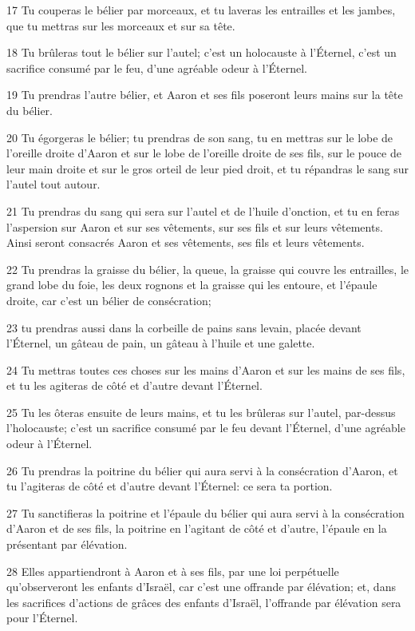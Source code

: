 \par 17 Tu couperas le bélier par morceaux, et tu laveras les entrailles et les jambes, que tu mettras sur les morceaux et sur sa tête.
\par 18 Tu brûleras tout le bélier sur l'autel; c'est un holocauste à l'Éternel, c'est un sacrifice consumé par le feu, d'une agréable odeur à l'Éternel.
\par 19 Tu prendras l'autre bélier, et Aaron et ses fils poseront leurs mains sur la tête du bélier.
\par 20 Tu égorgeras le bélier; tu prendras de son sang, tu en mettras sur le lobe de l'oreille droite d'Aaron et sur le lobe de l'oreille droite de ses fils, sur le pouce de leur main droite et sur le gros orteil de leur pied droit, et tu répandras le sang sur l'autel tout autour.
\par 21 Tu prendras du sang qui sera sur l'autel et de l'huile d'onction, et tu en feras l'aspersion sur Aaron et sur ses vêtements, sur ses fils et sur leurs vêtements. Ainsi seront consacrés Aaron et ses vêtements, ses fils et leurs vêtements.
\par 22 Tu prendras la graisse du bélier, la queue, la graisse qui couvre les entrailles, le grand lobe du foie, les deux rognons et la graisse qui les entoure, et l'épaule droite, car c'est un bélier de consécration;
\par 23 tu prendras aussi dans la corbeille de pains sans levain, placée devant l'Éternel, un gâteau de pain, un gâteau à l'huile et une galette.
\par 24 Tu mettras toutes ces choses sur les mains d'Aaron et sur les mains de ses fils, et tu les agiteras de côté et d'autre devant l'Éternel.
\par 25 Tu les ôteras ensuite de leurs mains, et tu les brûleras sur l'autel, par-dessus l'holocauste; c'est un sacrifice consumé par le feu devant l'Éternel, d'une agréable odeur à l'Éternel.
\par 26 Tu prendras la poitrine du bélier qui aura servi à la consécration d'Aaron, et tu l'agiteras de côté et d'autre devant l'Éternel: ce sera ta portion.
\par 27 Tu sanctifieras la poitrine et l'épaule du bélier qui aura servi à la consécration d'Aaron et de ses fils, la poitrine en l'agitant de côté et d'autre, l'épaule en la présentant par élévation.
\par 28 Elles appartiendront à Aaron et à ses fils, par une loi perpétuelle qu'observeront les enfants d'Israël, car c'est une offrande par élévation; et, dans les sacrifices d'actions de grâces des enfants d'Israël, l'offrande par élévation sera pour l'Éternel.
